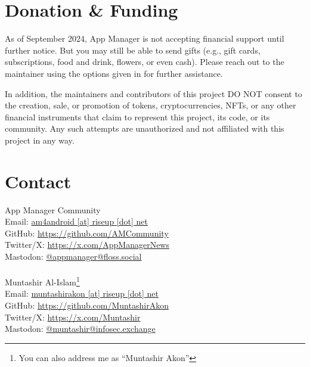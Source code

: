 \section{Donation \& Funding}\label{sec:donation-&-funding} %
%
%
%
%

As of September 2024, App Manager is not accepting financial support until further notice. But
you may still be able to send gifts (e.g., gift cards, subscriptions, food and drink, flowers, or
even cash). Please reach out to the maintainer using the options given in  for further
assistance.

In addition, the maintainers and contributors of this project DO NOT consent to the creation, sale,
or promotion of tokens, cryptocurrencies, NFTs, or any other financial instruments that claim to
represent this project, its code, or its community. Any such attempts are unauthorized and not
affiliated with this project in any way.

\section{Contact}\label{sec:contact} %
App Manager Community\\
Email: \href{mailto:am4android@riseup.net}{am4android [at] riseup [dot] net}\\
GitHub: \url{https://github.com/AMCommunity}\\
Twitter/X: \url{https://x.com/AppManagerNews}\\
Mastodon: \href{https://floss.social/@appmanager}{@appmanager@floss.social}\\
\\

Muntashir Al-Islam\footnote{You can also address me as ``Muntashir Akon''}\\
Email: \href{mailto:muntashirakon@riseup.net}{muntashirakon [at] riseup [dot] net}\\
GitHub: \url{https://github.com/MuntashirAkon}\\
Twitter/X: \url{https://x.com/Muntashir}\\
Mastodon: \href{https://infosec.exchange/@muntashir}{@muntashir@infosec.exchange}

